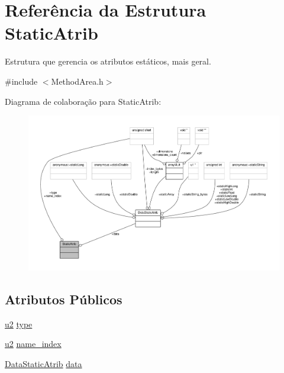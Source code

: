 \hypertarget{structStaticAtrib}{}\section{Referência da Estrutura Static\+Atrib}
\label{structStaticAtrib}


Estrutura que gerencia os atributos estáticos, mais geral.  




{\ttfamily \#include $<$Method\+Area.\+h$>$}



Diagrama de colaboração para Static\+Atrib\+:
\nopagebreak
\begin{figure}[H]
\begin{center}
\leavevmode
\includegraphics[width=350pt]{structStaticAtrib__coll__graph}
\end{center}
\end{figure}
\subsection*{Atributos Públicos}
\begin{DoxyCompactItemize}
\item 
\hyperlink{ClassLoader_8h_a5f223212eef04d10a4550ded680cb1cf}{u2} \hyperlink{structStaticAtrib_ace3f941daa9df10a76029562b3f9cef3}{type}
\item 
\hyperlink{ClassLoader_8h_a5f223212eef04d10a4550ded680cb1cf}{u2} \hyperlink{structStaticAtrib_a7066a25332e32a5d8eccc92d8b303635}{name\+\_\+index}
\item 
\hyperlink{unionDataStaticAtrib}{Data\+Static\+Atrib} \hyperlink{structStaticAtrib_aa9c612ef7f4696833d6658c21691b048}{data}
\end{DoxyCompactItemize}



